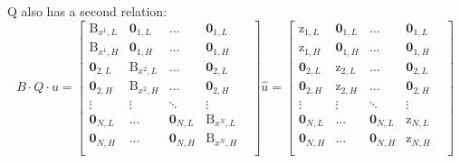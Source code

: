 \documentclass[11pt]{article}
\begin{document}
\begin{itemize}
		Q also has a second relation: 
		\begin{equation}
		B\cdot Q\cdot u  = 
		\begin{bmatrix}
		\text{B}_{x^{1},L} & \mathbf{0}_{1,L}       & ...    & \mathbf{0}_{1,L}\\
		\text{B}_{x^{1},H} & \mathbf{0}_{1,H}       & ...    & \mathbf{0}_{1,H}\\
		\mathbf{0}_{2,L}   & \text{B}_{x^{2},L} &   ...    & \mathbf{0}_{2,L}\\
		\mathbf{0}_{2,H}   & \text{B}_{x^{2},H} &   ...    & \mathbf{0}_{2,H}\\
		\vdots  & \vdots  & \ddots & \vdots \\
		\mathbf{0}_{N,L}       & ...    & \mathbf{0}_{N,L} & \text{B}_{x^{N},L} & \\
		\mathbf{0}_{N,H}       & ...    & \mathbf{0}_{N,H} & \text{B}_{x^{N},H} & \\
		\end{bmatrix}
		\hat{u}
		=
		\begin{bmatrix}
		\text{z}_{{1},L} & \mathbf{0}_{1,L}       & ...    & \mathbf{0}_{1,L}\\
		\text{z}_{{1},H} & \mathbf{0}_{1,H}       & ...    & \mathbf{0}_{1,H}\\
		\mathbf{0}_{2,L}   & \text{z}_{{2},L} &   ...    & \mathbf{0}_{2,L}\\
		\mathbf{0}_{2,H}   & \text{z}_{{2},H} &   ...    & \mathbf{0}_{2,H}\\
		\vdots  & \vdots  & \ddots & \vdots \\
		\mathbf{0}_{N,L}       & ...    & \mathbf{0}_{N,L} & \text{z}_{{N},L} & \\
		\mathbf{0}_{N,H}       & ...    & \mathbf{0}_{N,H} & \text{z}_{{N},H} & \\
		\end{bmatrix}
		\label{Q_operator_2}
		\end{equation}
		

\end{itemize}
\end{document}
